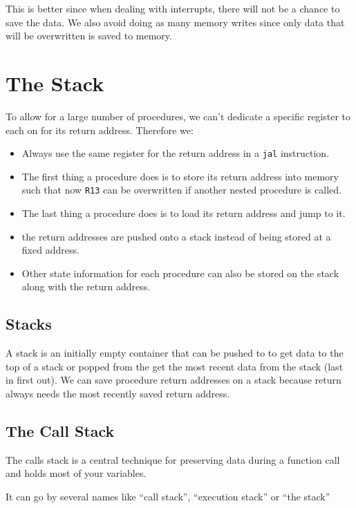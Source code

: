 This is better since when dealing with interrupts, there will not be a chance to save the data.
We also avoid doing as many memory writes since only data that will be overwritten is saved to memory.

\section{The Stack}\label{sec:the_stack}

To allow for a large number of procedures, we can't dedicate a specific register to each on for its return address.
Therefore we:
\begin{itemize}
    \item Always use the same register for the return address in a \texttt{jal} instruction.
    \item The first thing a procedure does is to store its return address into memory such that now \texttt{R13} can be overwritten if another nested procedure is called.
    \item The last thing a procedure does is to load its return address and jump to it.
    \item the return addresses are pushed onto a stack instead of being stored at a fixed address.
    \item Other state information for each procedure can also be stored on the stack along with the return address.
\end{itemize}

\subsection{Stacks}\label{sub:stacks}

A stack is an initially empty container that can be pushed to to get data to the top of a stack or popped from the get the most recent data from the stack (last in first out).
We can save procedure return addresses on a stack because return always needs the most recently saved return address.

\subsection{The Call Stack}\label{sub:the_call_stack}

The calls stack is a central technique for preserving data during a function call and holds most of your variables.

It can go by several names like ``call stack'', ``execution stack'' or ``the stack''

